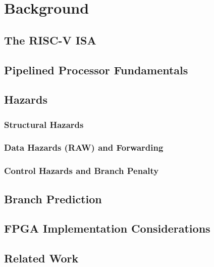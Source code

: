\chapter{Background}
\label{ch:background}

\section{The RISC-V ISA}

\section{Pipelined Processor Fundamentals}

\section{Hazards}
\subsection{Structural Hazards}
\subsection{Data Hazards (RAW) and Forwarding}
\subsection{Control Hazards and Branch Penalty}

\section{Branch Prediction}

\section{FPGA Implementation Considerations}

\section{Related Work}
